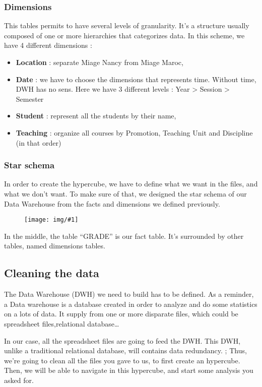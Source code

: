 \documentclass[11pt, a4paper]{article}
\newcommand\image[2]{
	\begin{figure}[H]
	\centering
	\texttt{[image: img/\#1]}
	\end{figure}
}
\begin{document}
     \subsubsection{Dimensions}

     This tables permits to have several levels of granularity. It’s a structure usually composed of
     one or more hierarchies that categorizes data. In this scheme, we have 4 different
     dimensions :
    \begin{itemize}
        \item \textbf{Location} : separate Miage Nancy from Miage Maroc,
        \item \textbf{Date} : we have to choose the dimensions that represents time. Without time,      DWH has no sens. Here we have 3 different levels : Year > Session > Semester
        \item \textbf{Student} : represent all the students by their name,
        \item \textbf{Teaching} : organize all courses by Promotion, Teaching Unit and Discipline (in that order)
    \end{itemize}

    \subsubsection{Star schema}

    In order to create the hypercube, we have to define what we want in the files, and
    what we don’t want. To make sure of that, we designed the star schema of our Data
    Warehouse from the facts and dimensions we defined previously.

    \image{star.png}{250px}

    In the middle, the table “GRADE” is our fact table. It’s surrounded by other tables,
    named dimensions tables.

    \subsection{Cleaning the data}

   The Data Warehouse (DWH) we need to build has to be defined. As a reminder, a Data warehouse is a database created in order to analyze and do some statistics on a lots of data. It supply from one or more disparate files, which could be spreadsheet files,relational database…

   In our case, all the spreadsheet files are going to feed the DWH. This DWH, unlike a
   traditional relational database, will contains data redundancy.
;
   Thus, we’re going to clean all the files you gave to us, to first create an hypercube. Then, we will be able to navigate in this hypercube, and start some analysis you asked for.
\end{document}
